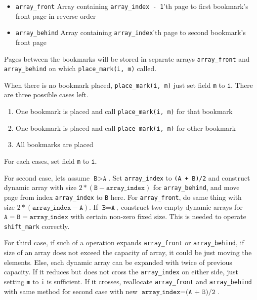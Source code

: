 \documentclass[12pt,twoside]{article}
\begin{document}
\begin{problems}
\begin{itemize}
\item \texttt{array\_front} Array containing \texttt{array\_index - 1}'th page to first bookmark's front page in reverse order
  
\item \texttt{array\_behind} Array containing \texttt{array\_index}'th page to second bookmark's front page
\end{itemize}

Pages between the bookmarks will be stored in separate arrays
\texttt{array\_front} and \texttt{array\_behind} on which
\texttt{place\_mark(i, m)} called.

When there is no bookmark placed, \texttt{place\_mark(i, m)} just set
field \texttt{m} to \texttt{i}. There are three possible cases left.

\begin{enumerate}
\item One bookmark is placed and call \texttt{place\_mark(i, m)} for that bookmark
  
\item One bookmark is placed and call \texttt{place\_mark(i, m)} for other bookmark
  
\item All bookmarks are placed
\end{enumerate}

For each cases, set field \texttt{m} to \texttt{i}.

For second case, lets assume $\texttt{B} > \texttt{A}$. Set
\texttt{array\_index} to \texttt{(A + B)/2} and construct dynamic
array with size $2 * (\texttt{B} - \texttt{array\_index})$ for
\texttt{array\_behind}, and move page from index \texttt{array\_index}
to \texttt{B} here. For \texttt{array\_front}, do same thing with size
$2 * (\texttt{array\_index} - \texttt{A})$. If
$\texttt{B} = \texttt{A}$, construct two empty dynamic arrays for
$\texttt{A} = \texttt{B} = \texttt{array\_index}$ with certain
non-zero fixed size. This is needed to operate \texttt{shift\_mark}
correctly.

For third case, if such of a operation expands \texttt{array\_front}
or \texttt{array\_behind}, if size of an array does not exceed the
capacity of array, it could be just moving the elements. Else, each
dynamic array can be expanded with twice of previous capacity. If it
reduces but does not cross the \texttt{array\_index} on either side,
just setting \texttt{m} to \texttt{i} is sufficient. If it crosses,
reallocate \texttt{array\_front} and \texttt{array\_behind} with same
method for second case with new
$\texttt{array\_index} = \texttt{(A + B)/2}$.


\end{problems}
\end{document}
